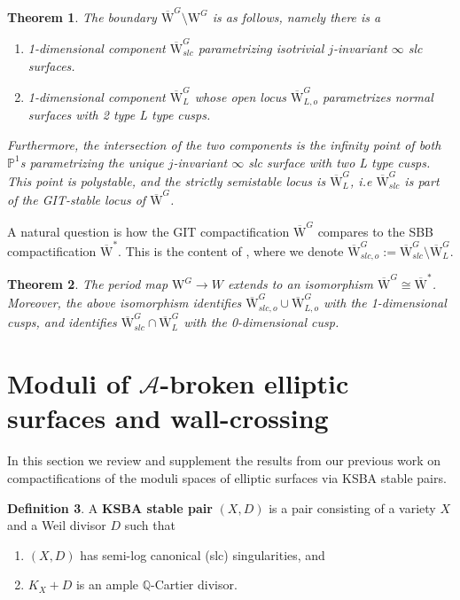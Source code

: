 \documentclass[11pt]{amsart}
\newtheorem{theorem}{Theorem}[section]
\theoremstyle{definition}
\newtheorem{definition}[theorem]{Definition}
\theoremstyle{remark}
\newcommand{\bP}{{\mathbb P}}
\newcommand{\calA}{\mathcal A}
\newcommand{\oMG}{\overline{\mathrm{W}}^G}
\newcommand{\MG}{{\mathrm{W}}^G}
\newcommand{\oMGslc}{\overline{\mathrm{W}}^G_{slc}}
\newcommand{\oMGL}{\overline{\mathrm{W}}^G_L}
\newcommand{\oMGslco}{\overline{\mathrm{W}}^G_{slc,o}}
\newcommand{\oMGLo}{\overline{\mathrm{W}}^G_{L,o}}
\newcommand{\sbb}{\overline{\mathrm{W}}^{*}}
\begin{document}
	
	\begin{theorem}\cite[Proposition 7.4]{oo}\label{thm:gitsss} The boundary $\oMG \setminus \MG$ is as follows, namely there is a
		\begin{enumerate}
			\item 1-dimensional component $\oMGslc$ parametrizing isotrivial $j$-invariant $\infty$ slc surfaces.
			\item  1-dimensional component $\oMGL$ whose open locus $\oMGLo$ parametrizes normal surfaces with 2 type L type cusps. 
		\end{enumerate}
		Furthermore, the intersection of the two components is the infinity point of both $\bP^1$s parametrizing the unique $j$-invariant $\infty$ slc surface with two L type cusps. This point is polystable, and the strictly semistable locus is $\oMGL$, i.e $\oMGslc$ is part of the GIT-stable locus of $\oMG$.
	\end{theorem}
	
	A natural question is how the GIT compactification $\oMG$ compares to the SBB compactification $\sbb$. This is the content of \cite[Theorem 7.9]{oo}, where we denote $\oMGslco := \oMGslc \setminus \oMGL$.
	
	\begin{theorem}\cite[Theorem 7.9]{oo}
		The period map $\MG \to W$  extends to an isomorphism $\oMG \cong \sbb$. Moreover, the above isomorphism identifies $\oMGslco \cup \oMGLo$ with the 1-dimensional cusps, and identifies $\oMGslc \cap \oMGL$ with the 0-dimensional cusp.
	\end{theorem}
	
	
	\section{Moduli of $\calA$-broken elliptic surfaces and wall-crossing}\label{sec:broken}
	
	In this section we review and supplement the results from our previous work on compactifications of the moduli spaces of elliptic surfaces via KSBA stable pairs. 
	
	\begin{definition} A \textbf{KSBA stable pair} $(X,D)$ is a pair consisting of a variety $X$ and a Weil divisor $D$ such that 
		\begin{enumerate} 
			\item $(X,D)$ has semi-log canonical (slc) singularities, and
			\item $K_X + D$ is an ample $\mathbb{Q}$-Cartier divisor. 
		\end{enumerate}
	\end{definition}
	
\end{document}
